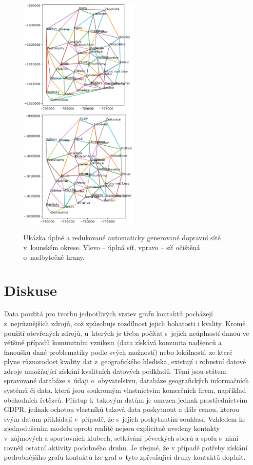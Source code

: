 \begin{figure}
\centering
\includegraphics[width=60mm]{pic/doprava_01.png}
\includegraphics[width=60mm]{pic/doprava_02.png}
\caption{Ukázka úplné a redukované automaticky generované dopravní sítě v~lounském okrese. Vlevo -- úplná síť, vpravo -- síť očištěná o~nadbytečné hrany.}
\label{dopravnisit}
\end{figure}




\section*{Diskuse}

Data použitá pro tvorbu jednotlivých vrstev grafu kontaktů pocházejí z~nejrůznějších zdrojů, což způsobuje rozdílnost jejich bohatosti i kvality. Kromě použití otevřených zdrojů, u~kterých je třeba počítat s~jejich neúplností danou ve většině případů komunitním vznikem (data získává komunita nadšenců a fanoušků dané problematiky podle svých možností) nebo lokálností, ze které plyne různorodost kvality dat z~geografického hlediska, existují i robustní datové zdroje umožňující získání kvalitních datových podkladů. Těmi jsou státem spravované databáze s~údaji o~obyvatelstvu, databáze geografických informačních systémů či data, která jsou soukromým vlastnictvím komerčních firem, například obchodních řetězců. Přístup k~takovým datům je omezen jednak prostřednictvím GDPR, jednak ochotou vlastníků taková data poskytnout a dále cenou, kterou svým datům přikládají v~případě, že s~jejich poskytnutím souhlasí. Vzhledem ke zjednodušením modelu oproti realitě nejsou explicitně uvedeny kontakty v~zájmových a sportovních klubech, setkávání pěveckých sborů a spolu s~nimi rovněž ostatní aktivity podobného druhu. Je zřejmé, že v případě potřeby získání podrobnějšího grafu kontaktů lze graf o~tyto zpřesňující druhy kontaktů doplnit.

